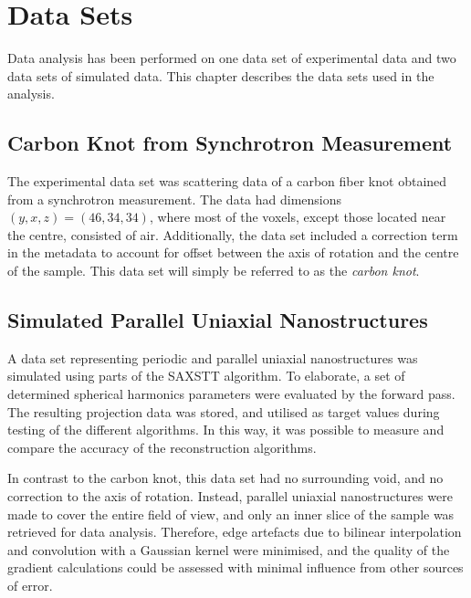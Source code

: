 \chapter{Data Sets} %
\label{ch:reconstruction_data_sets}

Data analysis has been performed on one data set of experimental data and two data sets of simulated data.
This chapter describes the data sets used in the analysis.

\section{Carbon Knot from Synchrotron Measurement} %
\label{sec:data_set_carbon_knot}
The experimental data set was scattering data of a carbon fiber knot obtained from a synchrotron measurement.
The data had dimensions $(y,x,z) = (46,34,34)$, where most of the voxels, except those located near the centre, consisted of air.  %
Additionally, the data set included a correction term in the metadata to account for offset between the axis of rotation
and the centre of the sample. This data set will simply be referred to as the \emph{carbon knot}.


\section{Simulated Parallel Uniaxial Nanostructures} %
\label{sec:reconstruction_data_sets_periodic_parallel_uniaxial_nanostructures}
A data set representing periodic and parallel uniaxial nanostructures was simulated using parts of the SAXSTT algorithm.
To elaborate, a set of determined spherical harmonics parameters were evaluated by the forward pass.
The resulting projection data was stored, and utilised as target values during testing of the different algorithms.
In this way, it was possible to measure and compare the accuracy of the reconstruction algorithms.

In contrast to the carbon knot, this data set had no surrounding void, and no correction to the axis of rotation.
Instead, parallel uniaxial nanostructures were made to cover the entire field of view, and only an inner slice of the sample was retrieved for data analysis.
Therefore, edge artefacts due to bilinear interpolation and convolution with a Gaussian kernel were minimised,
and the quality of the gradient calculations could be assessed with minimal influence from other sources of error.


